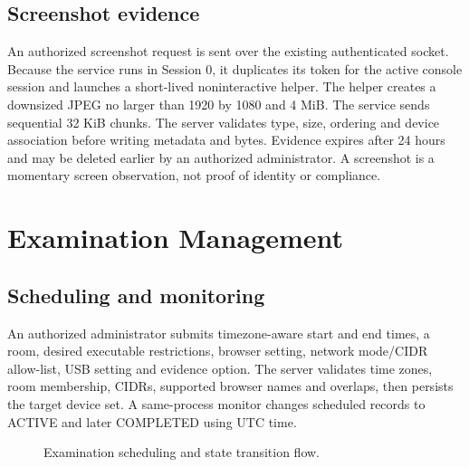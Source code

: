 \documentclass[12pt,a4paper]{report}
\begin{document}
\subsection{Screenshot evidence}
An authorized screenshot request is sent over the existing authenticated
socket. Because the service runs in Session 0, it duplicates its token for
the active console session and launches a short-lived noninteractive helper.
The helper creates a downsized JPEG no larger than 1920 by 1080 and 4 MiB.
The service sends sequential 32 KiB chunks. The server validates type, size,
ordering and device association before writing metadata and bytes. Evidence
expires after 24 hours and may be deleted earlier by an authorized
administrator. A screenshot is a momentary screen observation, not proof of
identity or compliance.

\section{Examination Management}

\subsection{Scheduling and monitoring}
An authorized administrator submits timezone-aware start and end times, a room,
desired executable restrictions, browser setting, network mode/CIDR allow-list,
USB setting and evidence option. The server validates time zones, room
membership, CIDRs, supported browser names and overlaps, then persists the
target device set. A same-process monitor changes scheduled records to ACTIVE
and later COMPLETED using UTC time.

\begin{figure}[H]
\centering
{}
\caption{Examination scheduling and state transition flow.}
\label{fig:exam-scheduling-flow}
\end{figure}
\end{document}
